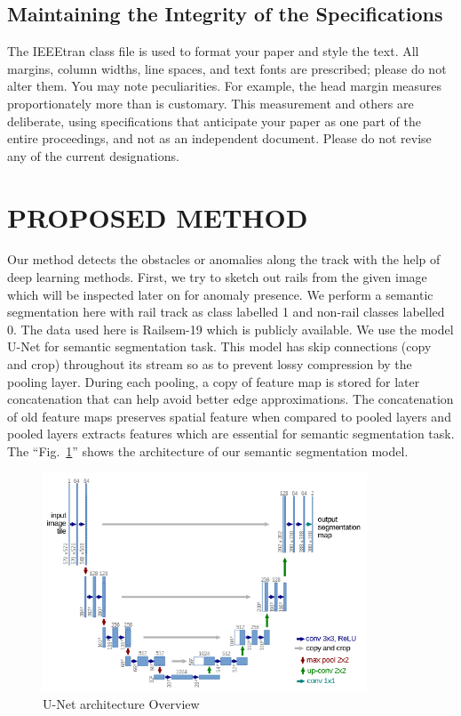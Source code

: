 \documentclass[conference]{IEEEtran}
\begin{document}
\subsection{Maintaining the Integrity of the Specifications}

The IEEEtran class file is used to format your paper and style the text. All margins, 
column widths, line spaces, and text fonts are prescribed; please do not 
alter them. You may note peculiarities. For example, the head margin
measures proportionately more than is customary. This measurement 
and others are deliberate, using specifications that anticipate your paper 
as one part of the entire proceedings, and not as an independent document. 
Please do not revise any of the current designations.

\section{PROPOSED METHOD}
Our method detects the obstacles or anomalies along the track with the help of deep learning methods. First, we try to sketch out rails from the given image which will be inspected later on for anomaly presence. We perform a semantic segmentation here with rail track as class labelled 1 and non-rail classes labelled 0. The data used here is Railsem-19 \cite{b1} 
 which is publicly available. We use the model U-Net \cite{b2} for semantic segmentation task. This model has skip connections (copy and crop) throughout its stream so as to prevent lossy compression by the pooling layer. During each pooling, a copy of feature map is stored for later concatenation that can help avoid better edge approximations. The concatenation of old feature maps preserves spatial feature when compared to pooled layers and pooled layers extracts features which are essential for semantic segmentation task. The ``Fig.~\ref{U-Net}'' shows the architecture of our semantic segmentation model.
\begin{figure}[htbp]
\centerline{\includegraphics[height=6.5cm]{U-Net_model.png}}
\caption{U-Net architecture Overview}
\label{U-Net}
\end{figure} 
\end{document}
